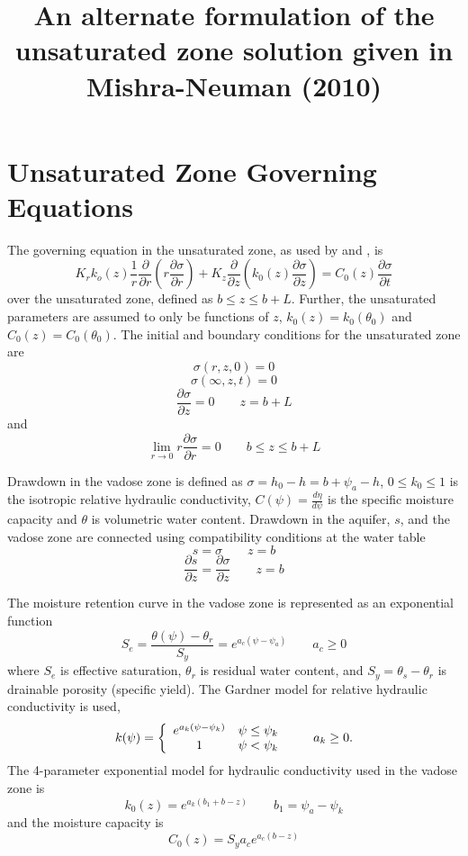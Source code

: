 \documentclass{article}
\title{An alternate formulation of the unsaturated zone solution given in Mishra-Neuman (2010)}
\begin{document}
\maketitle
\section{Unsaturated Zone Governing Equations}
The governing equation in the unsaturated zone, as used by \cite{mishra10} and \cite{tartakovsky07}, is
\begin{equation}
  \label{eq:unsatDim}
  K_r k_o(z) \frac{1}{r} \frac{\partial}{\partial r} \left( r\frac{\partial \sigma}{\partial r} \right) + K_z \frac{\partial}{\partial z} \left( k_0(z) \frac{\partial \sigma}{\partial z}\right) = C_0(z) \frac{\partial \sigma}{\partial t}
\end{equation}
over the unsaturated zone, defined as $b \le z \le b+L$.  Further, the unsaturated parameters are assumed to only be functions of $z$, $k_0(z)=k_0(\theta_0)$ and $C_0(z)=C_0(\theta_0)$.  The initial and boundary conditions for the unsaturated zone are  
$$\sigma(r,z,0) = 0$$
$$\sigma(\infty,z,t)=0$$
$$\frac{\partial \sigma}{\partial z}=0 \qquad z=b+L$$ and 
$$\lim_{r \rightarrow 0} r \frac{\partial \sigma}{\partial r} = 0 \qquad b\le z \le b+L$$

Drawdown in the vadose zone is defined as $\sigma = h_0 - h=b+\psi_a - h$, $0 \le k_0 \le 1$ is the isotropic relative hydraulic conductivity, $C(\psi)=\frac{d\eta}{d \psi}$ is the specific moisture capacity and $\theta$ is volumetric water content.  Drawdown in the aquifer, $s$, and the vadose zone are connected using compatibility conditions at the water table
$$s=\sigma \qquad z=b$$
$$\frac{\partial s}{\partial z}=\frac{\partial \sigma}{\partial z} \qquad z=b$$ 

The moisture retention curve in the vadose zone is represented as an exponential function
$$S_e = \frac{\theta(\psi) - \theta_r}{S_y} = e^{a_c \left( \psi - \psi_a \right)} \qquad a_c \ge 0 $$
where $S_e$ is effective saturation, $\theta_r$ is residual water content, and $S_y=\theta_s - \theta_r$ is drainable porosity (specific yield).  The Gardner model for relative hydraulic conductivity is used,
\begin{equation}
  \nonumber
  k(\psi) = \left  \{ 
    \begin{array}{c c}
      e^{a_k \left( \psi - \psi_k\right)} & \psi \le \psi_k \\
      1 & \psi < \psi_k\\
    \end{array} 
\right . \qquad a_k \ge 0.
\end{equation}
The 4-parameter exponential model for hydraulic conductivity used in the vadose zone is 
\begin{equation}
  \label{eq:Gardner}
 k_0(z)=e^{a_k\left( b_1 + b - z\right)} \qquad b_1=\psi_a-\psi_k
\end{equation}
and the moisture capacity is
\begin{equation}
  \label{eq:mrc}
C_0(z) = S_y a_c e^{a_c \left( b-z\right)}
\end{equation}
\end{document}
